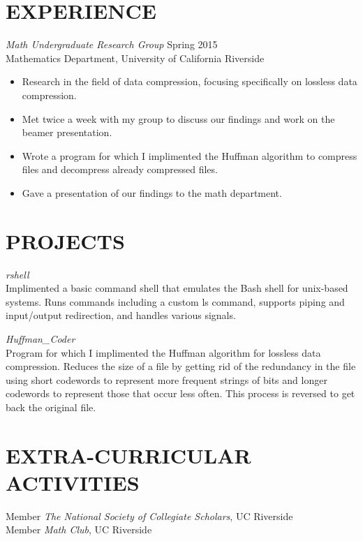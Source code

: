 \documentclass[margin, 10pt]{res}
\begin{document}
\begin{resume}
\section{EXPERIENCE}
{\sl Math Undergraduate Research Group} \hfill Spring 2015 \\
Mathematics Department, University of California Riverside 
\begin{itemize} \itemsep -2pt 
\item Research in the field of data compression, focusing specifically on lossless data compression.
\item Met twice a week with my group to discuss our findings and work on the beamer presentation.
\item Wrote a program for which I implimented the Huffman algorithm to compress files and decompress already compressed files.
\item Gave a presentation of our findings to the math department.
\end{itemize}

\section{PROJECTS}
{\sl rshell} \\
Implimented a basic command shell that emulates the Bash shell for unix-based systems. Runs commands including a custom ls command, supports piping and input/output redirection, and handles various signals. 

{\sl Huffman\_Coder} \\
Program for which I implimented the Huffman algorithm for lossless data compression. Reduces the size of a file by getting rid of the redundancy in the file using short codewords to represent more frequent strings of bits and longer codewords to represent those that occur less often. This process is reversed to get back the original file.

\section{EXTRA-CURRICULAR \\ ACTIVITIES} 
Member {\it The National Society of Collegiate Scholars}, UC Riverside \\
Member {\it Math Club}, UC Riverside

\end{resume}
\end{document}
